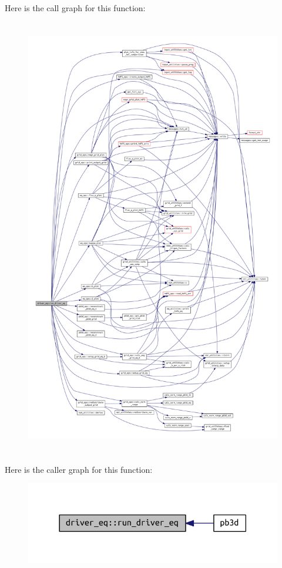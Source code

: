 Here is the call graph for this function\+:
\nopagebreak
\begin{figure}[H]
\begin{center}
\leavevmode
\includegraphics[height=550pt]{namespacedriver__eq_ac8eca434f541966edc3556d72f261eff_cgraph}
\end{center}
\end{figure}
Here is the caller graph for this function\+:
\nopagebreak
\begin{figure}[H]
\begin{center}
\leavevmode
\includegraphics[width=318pt]{namespacedriver__eq_ac8eca434f541966edc3556d72f261eff_icgraph}
\end{center}
\end{figure}
